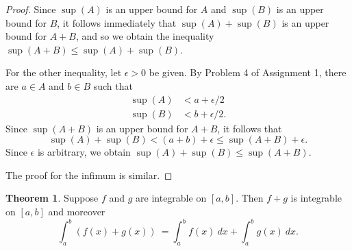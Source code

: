 \documentclass[12pt]{article}
\theoremstyle{definition}
\theoremstyle{theorem}
\newtheorem{theorem}[definition]{Theorem}
\begin{document}
\begin{proof}
Since $\sup(A)$ is an upper bound for $A$ and $\sup(B)$ is an upper bound for $B$, it follows immediately that $\sup(A) + \sup(B)$ is an upper bound for $A + B$, and so we obtain the inequality $\sup(A + B) \leqslant \sup(A) + \sup(B)$. 

For the other inequality, let $\epsilon > 0$ be given. By Problem 4 of Assignment 1, there are $a \in A$ and $b \in B$ such that 
\begin{align*}
\sup(A) &< a + \epsilon/2 \\
\sup(B) &< b + \epsilon/2.
\end{align*}
Since $\sup(A + B)$ is an upper bound for $A + B$, it follows that  
\[
\sup(A) + \sup(B) < (a + b) + \epsilon \leqslant \sup(A + B) + \epsilon.
\]
Since $\epsilon$ is arbitrary, we obtain $\sup(A) + \sup(B) \leqslant \sup(A + B)$.

The proof for the infimum is similar. 
\end{proof}

\begin{theorem}
Suppose $f$ and $g$ are integrable on $[a,b]$. Then $f + g$ is integrable on $[a,b]$ and moreover 
\[
\int_a^b (f(x) + g(x)) \: = \int_a^b f(x)\: dx + \int_a^b g(x)\: dx.
\]
\end{theorem}
\end{document}
